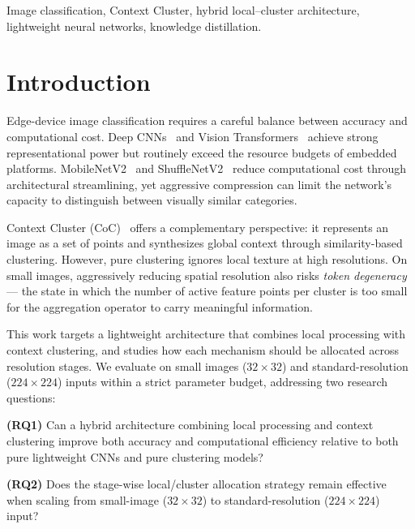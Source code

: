 \documentclass[conference]{IEEEtran}
\begin{document}
\begin{IEEEkeywords}
Image classification, Context Cluster, hybrid local--cluster
architecture, lightweight neural networks, knowledge distillation.
\end{IEEEkeywords}

\section{Introduction}
\label{sec:intro}

Edge-device image classification requires a careful balance between
accuracy and computational cost. Deep CNNs~\cite{He2016ResNet} and
Vision Transformers~\cite{Dosovitskiy2021ViT} achieve strong
representational power but routinely exceed the resource budgets of
embedded platforms. MobileNetV2~\cite{Sandler2018MobileNetV2} and
ShuffleNetV2~\cite{Ma2018ShuffleNetV2} reduce computational cost
through architectural streamlining, yet aggressive compression can
limit the network's capacity to distinguish between visually similar
categories.

Context Cluster (CoC)~\cite{Ma2023ImageAsSetOfPoints} offers a
complementary perspective: it represents an image as a set of points
and synthesizes global context through similarity-based clustering.
However, pure clustering ignores local texture at high resolutions.
On small images, aggressively reducing spatial resolution also risks
\emph{token degeneracy} --- the state in which the number of active
feature points per cluster is too small for the aggregation operator
to carry meaningful information.

This work targets a lightweight architecture that combines local
processing with context clustering, and studies how each mechanism
should be allocated across resolution stages. We evaluate on small
images ($32\!\times\!32$) and standard-resolution ($224\!\times\!224$)
inputs within a strict parameter budget, addressing two research
questions:

\noindent\textbf{(RQ1)} Can a hybrid architecture combining local
processing and context clustering improve both accuracy and
computational efficiency relative to both pure lightweight CNNs and
pure clustering models?

\noindent\textbf{(RQ2)} Does the stage-wise local/cluster allocation
strategy remain effective when scaling from small-image
($32\!\times\!32$) to standard-resolution ($224\!\times\!224$) input?
\end{document}
